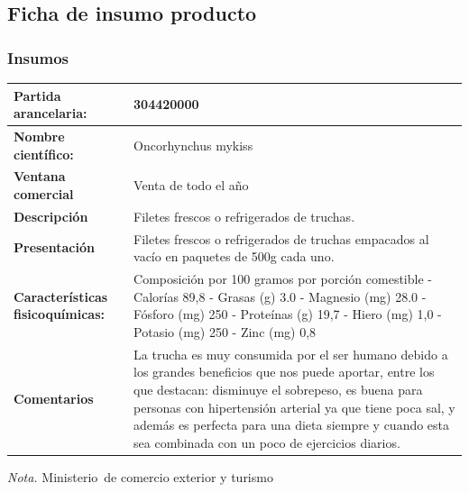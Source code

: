 \documentclass[
  stu,
  floatsintext,
  longtable,
  a4paper,
  nolmodern,
  notxfonts,
  notimes,
  12pt,
  colorlinks=true,linkcolor=blue,citecolor=blue,urlcolor=blue]{apa7}
\newcounter{none} %
\begin{document}
\subsection{Ficha de insumo producto}\label{ficha-de-insumo-producto}

\subsubsection{Insumos}\label{insumos}

\begin{table}

{\caption{{Ficha de insumo producto}{\label{tbl-mytable2}}}}

{\def\LTcaptype{none} %
\begin{longtable}[]{@{}
  >{\raggedright\arraybackslash}p{}
  >{\raggedright\arraybackslash}p{}@{}}
\toprule\noalign{}
\begin{minipage}[b]{\linewidth}\raggedright
\textbf{Partida arancelaria:}
\end{minipage} & \begin{minipage}[b]{\linewidth}\raggedright
304420000
\end{minipage} \\
\midrule\noalign{}
\endhead
\bottomrule\noalign{}
\endlastfoot
\textbf{Nombre científico:} & Oncorhynchus mykiss \\
\textbf{Ventana comercial} & Venta de todo el año \\
\textbf{Descripción} & Filetes frescos o refrigerados de truchas. \\
\textbf{Presentación} & Filetes frescos o refrigerados de truchas
empacados al vacío en paquetes de 500g cada uno. \\
\textbf{Características fisicoquímicas:} & Composición por 100 gramos
por porción comestible - Calorías 89,8 - Grasas (g) 3.0 - Magnesio (mg)
28.0 - Fósforo (mg) 250 - Proteínas (g) 19,7 - Hiero (mg) 1,0 - Potasio
(mg) 250 - Zinc (mg) 0,8 \\
\textbf{Comentarios} & La trucha es muy consumida por el ser humano
debido a los grandes beneficios que nos puede aportar, entre los que
destacan: disminuye el sobrepeso, es buena para personas con
hipertensión arterial ya que tiene poca sal, y además es perfecta para
una dieta siempre y cuando esta sea combinada con un poco de ejercicios
diarios. \\
\end{longtable}
}

\noindent \emph{Nota.} Ministerio~de comercio exterior y turismo

\end{table}
\end{document}
